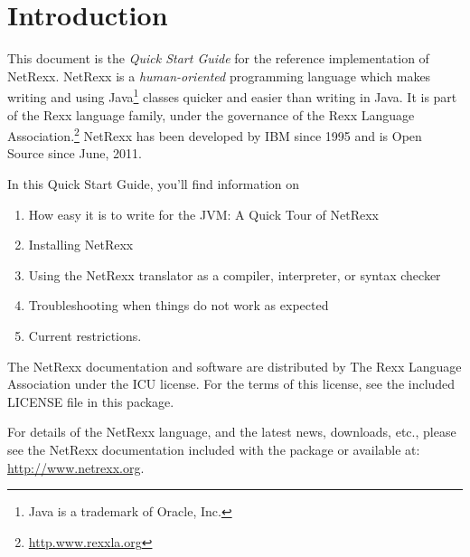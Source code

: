 \chapter{Introduction}
This document is the \emph{Quick Start Guide} for the reference implementation of
NetRexx. NetRexx is a \emph{human-oriented} programming language which makes
writing and using Java\footnote{Java is a trademark of Oracle, Inc.}
classes quicker and easier than writing in Java. It is part of the Rexx
language family, under the governance of the Rexx Language
Association.\footnote{\url{http.www.rexxla.org}} NetRexx has been
developed by IBM since 1995 and is Open Source
since June, 2011.

In this Quick Start Guide, you’ll find information on
\begin{enumerate} 
\item How easy it is to write for the JVM: A Quick Tour of NetRexx
\item Installing NetRexx 
\item Using the NetRexx translator as a compiler, interpreter, or
  syntax checker 
\item Troubleshooting when things do not work as expected
\item Current restrictions.
\end{enumerate} 
The NetRexx documentation and software are distributed
by The Rexx Language Association under the \textsc{ICU} license. For
the terms of this license, see the included \textsc{LICENSE} file in
this package.

For details of the NetRexx language, and the latest news, downloads,
etc., please see the NetRexx documentation included with the package
or available at: \url{http://www.netrexx.org}.

